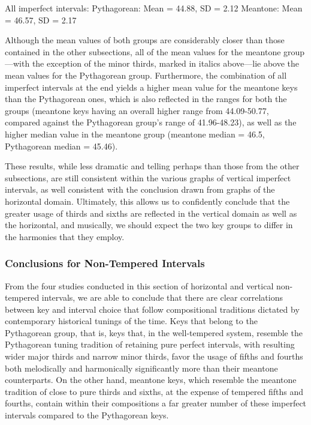 All imperfect intervals: Pythagorean: Mean = 44.88, SD = 2.12 Meantone:
Mean = 46.57, SD = 2.17

Although the mean values of both groups are considerably closer than
those contained in the other subsections, all of the mean values for the
meantone group---with the exception of the minor thirds, marked in
italics above---lie above the mean values for the Pythagorean group.
Furthermore, the combination of all imperfect intervals at the end
yields a higher mean value for the meantone keys than the Pythagorean
ones, which is also reflected in the ranges for both the groups
(meantone keys having an overall higher range from 44.09-50.77, compared
against the Pythagorean group's range of 41.96-48.23), as well as the
higher median value in the meantone group (meantone median = 46.5,
Pythagorean median = 45.46).

These results, while less dramatic and telling perhaps than those from
the other subsections, are still consistent within the various graphs of
vertical imperfect intervals, as well consistent with the conclusion
drawn from graphs of the horizontal domain. Ultimately, this allows us
to confidently conclude that the greater usage of thirds and sixths are
reflected in the vertical domain as well as the horizontal, and
musically, we should expect the two key groups to differ in the
harmonies that they employ.

\subsubsection{Conclusions for Non-Tempered
Intervals}\label{conclusions-for-non-tempered-intervals}

From the four studies conducted in this section of horizontal and
vertical non-tempered intervals, we are able to conclude that there are
clear correlations between key and interval choice that follow
compositional traditions dictated by contemporary historical tunings of
the time. Keys that belong to the Pythagorean group, that is, keys that,
in the well-tempered system, resemble the Pythagorean tuning tradition
of retaining pure perfect intervals, with resulting wider major thirds
and narrow minor thirds, favor the usage of fifths and fourths both
melodically and harmonically significantly more than their meantone
counterparts. On the other hand, meantone keys, which resemble the
meantone tradition of close to pure thirds and sixths, at the expense of
tempered fifths and fourths, contain within their compositions a far
greater number of these imperfect intervals compared to the Pythagorean
keys.

